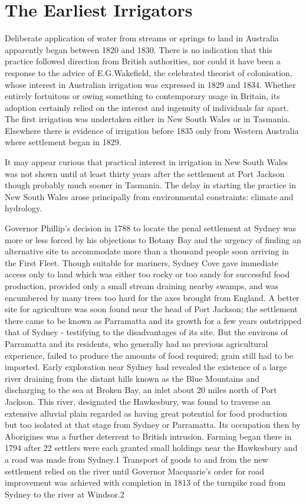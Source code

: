 
\chapter{The Earliest Irrigators}

Deliberate application of water from streams or springs to land in
Australia apparently began between 1820 and 1830. There is no
indication that this practice followed direction from British
authorities, nor could it have been a response to the advice of
E.G.Wakefield, the celebrated theorist of colonisation, whose interest
in Australian irrigation was expressed in 1829 and 1834. Whether
entirely fortuitous or owing something to contemporary usage in
Britain, its adoption certainly relied on the interest and ingenuity
of individuals far apart. The first irrigation was undertaken either
in New South Wales or in Tasmania. Elsewhere there is evidence of
irrigation before 1835 only from Western Australia where settlement
began in 1829.

It may appear curious that practical interest in irrigation in New
South Wales was not shown until at least thirty years after the
settlement at Port Jackson though probably much sooner in
Tasmania. The delay in starting the practice in New South Wales arose
principally from environmental constraints: climate and hydrology.

Governor Phillip's decision in 1788 to locate the penal settlement at
Sydney was more or less forced by his objections to Botany Bay and the
urgency of finding an alternative site to accommodate more than a
thousand people soon arriving in the First Fleet. Though suitable for
mariners, Sydney Cove gave immediate access only to land which was
either too rocky or too sandy for successful food production, provided
only a small stream draining nearby swamps, and was encumbered by many
trees too hard for the axes brought from England. A better site for
agriculture was soon found near the head of Port Jackson; the
settlement there came to be known as Parramatta and its growth for a
few years outstripped that of Sydney - testifying to the disadvantages
of its site. But the environs of Parramatta and its residents, who
generally had no previous agricultural experience, failed to produce
the amounts of food required; grain still had to be imported. Early
exploration near Sydney had revealed the existence of a large river
draining from the distant hills known as the Blue Mountains and
discharging to the sea at Broken Bay, an inlet about 20 miles north of
Port Jackson. This river, designated the Hawkesbury, was found to
traverse an extensive alluvial plain regarded as having great
potential for food production but too isolated at that stage from
Sydney or Parramatta. Its occupation then by Aborigines was a further
deterrent to British intrusion. Farming began there in 1794 after 22
settlers were each granted small holdings near the Hawkesbury and a
road was made from Sydney.1 Transport of goods to and from the new
settlement relied on the river until Governor Macquarie's order for
road improvement was achieved with completion in 1813 of the turnpike
road from Sydney to the river at Windsor.2

